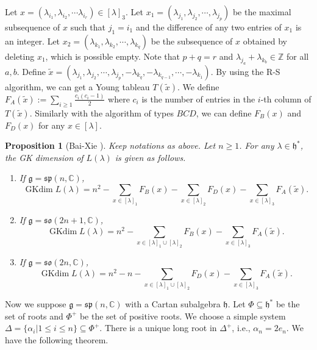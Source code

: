 \documentclass{amsart}[12pt]
\newtheorem{Pro}{Proposition}[section]
\renewcommand{\subset}{\subseteq}
\newcommand{\gkd}{\operatorname{GKdim}}
\numberwithin{equation}{section}
\begin{document}
	
	Let  $ x=(\lambda_{i_1}, \lambda_{i_2},\cdots \lambda_{i_r})\in[\lambda]_3 $. Let $  x_1=(\lambda_{j_1}, \lambda_{j_2},\cdots, \lambda_{j_p}) $ be the maximal subsequence of $ x $ such that $ j_1=i_1 $ and the difference of any two entries of $ x_1 $ is an integer. Let $ x_2= (\lambda_{k_1}, \lambda_{k_2},\cdots, \lambda_{k_q}) $ be the subsequence of $ x $ obtained by deleting $ x_1 $, which is possible empty. Note that $ p+q=r $ and $ \lambda_{j_a}+\lambda_{k_b} \in \mathbb{Z}$ for all $ a,b $.
	Define
	$ \tilde{x}=(\lambda_{j_1}, \lambda_{j_2},\cdots, \lambda_{j_p}, -\lambda_{k_q}, -\lambda_{k_{q-1}},\cdots ,-\lambda_{k_1}). $
	By using the R-S algorithm, we can get a Young tableau $T(\tilde{x})$.  We define $ F_A(\tilde{x}) :=\sum\limits_{i\geq 1}\frac{c_i(c_i-1)}2$ where $ c_i $ is the number of entries in the $ i $-th column of $T(\tilde{x})$. Similarly with the algorithm of types $BCD$, we can define $F_B(x)$ and  $F_D(x)$ for any $x\in [\lambda]$.
	
	
	
	
	
	
	




\begin{Pro}[Bai-Xie \cite{BX-2}]\label{BCD}
	Keep notations as above. Let $ n\geq 1 $.
	For any $ \lambda\in \mathfrak{h}^* $, the GK dimension of  $ L(\lambda) $  is given as follows.
	\begin{enumerate}
		\item If $  \mathfrak{g}= \mathfrak{sp}(n,\mathbb{C})$,
		\[
		\gkd L(\lambda)=n^2-\sum _{x\in [\lambda]_1} F_B(x)-\sum _{x\in [\lambda]_2} F_D(x)-\sum _{x\in [\lambda]_3} F_A(\tilde{x}).
		\]
		\item  If $  \mathfrak{g} = \mathfrak{so}(2n+1,\mathbb{C}) $,
		\[
	\gkd L(\lambda)=	n^2-\sum _{x\in [\lambda]_1\cup [\lambda]_2} F_B(x)-\sum _{x\in [\lambda]_3} F_A(\tilde{x}).
		\]
		\item  If $  \mathfrak{g} = \mathfrak{so}(2n,\mathbb{C}) $,
		\[
		\gkd L(\lambda)=n^2-n-\sum _{x\in [\lambda]_1\cup [\lambda]_2} F_D(x)-\sum _{x\in [\lambda]_3} F_A(\tilde{x}).
		\]
	\end{enumerate}
\end{Pro}



Now	we suppose  $\mathfrak{g}=\mathfrak{sp}(n, \mathbb{C})$ with a Cartan subalgebra $\mathfrak{h}$. Let $\Phi\subseteq \mathfrak{h}^*$ be the set of roots and $\Phi^+$ be the set of positive roots. We choose  a simple system $\Delta=\{\alpha_i|1\leq i\leq n\}\subset\Phi^+$. There is a unique long root in $\Delta^+$, i.e., $\alpha_{n}=2e_n$. We have the following theorem.
\end{document}
